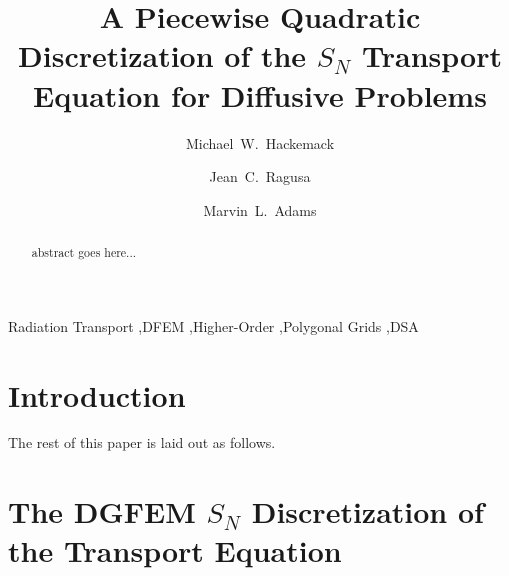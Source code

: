 \documentclass[preprint,review,10pt]{elsarticle}
\begin{document}
\begin{frontmatter}
\title{A Piecewise Quadratic Discretization of the $S_N$ Transport Equation for Diffusive Problems}
\author[kapl]{Michael~W.~Hackemack}
\author[tamu]{Jean~C.~Ragusa}
\author[tamu]{Marvin~L.~Adams}
\address[kapl]{Knolls Atomic Power Laboratory, P.O. Box 1072, Schenectady, NY 12301, USA}
\address[tamu]{Department of Nuclear Engineering, Texas A\&M University, College Station, TX 77843, USA}
\begin{abstract}
abstract goes here...
\end{abstract}
\begin{keyword}
Radiation Transport \sep DFEM \sep Higher-Order \sep Polygonal Grids \sep DSA 
\end{keyword}
\end{frontmatter}

\linenumbers

\section{Introduction} \label{sec::intro}


The rest of this paper is laid out as follows.

\section{The DGFEM $S_N$ Discretization of the Transport Equation} \label{sec::trans}


\end{document}
